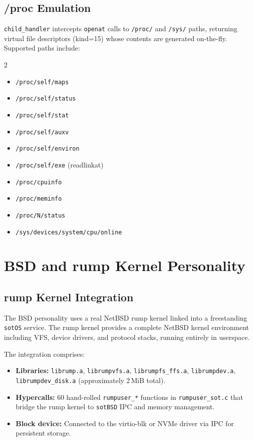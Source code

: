 \documentclass[11pt,a4paper,twoside]{report}
\theoremstyle{definition}
\newcommand{\sotOS}{\texttt{sotOS}}
\newcommand{\sotBSD}{\texttt{sotBSD}}
\begin{document}
\section{/proc Emulation}

\texttt{child\_handler} intercepts \texttt{openat} calls to \texttt{/proc/}
and \texttt{/sys/} paths, returning virtual file descriptors (kind=15) whose
contents are generated on-the-fly. Supported paths include:

\begin{multicols}{2}
\begin{itemize}[leftmargin=1em,itemsep=0pt]
  \item \texttt{/proc/self/maps}
  \item \texttt{/proc/self/status}
  \item \texttt{/proc/self/stat}
  \item \texttt{/proc/self/auxv}
  \item \texttt{/proc/self/environ}
  \item \texttt{/proc/self/exe} (readlinkat)
  \item \texttt{/proc/cpuinfo}
  \item \texttt{/proc/meminfo}
  \item \texttt{/proc/N/status}
  \item \texttt{/sys/devices/system/cpu/online}
\end{itemize}
\end{multicols}


\chapter{BSD and rump Kernel Personality}
\label{ch:bsd}

\section{rump Kernel Integration}

The BSD personality uses a real NetBSD rump kernel linked into a freestanding
\sotOS{} service. The rump kernel provides a complete NetBSD kernel
environment including VFS, device drivers, and protocol stacks, running
entirely in userspace.

The integration comprises:
\begin{itemize}[leftmargin=1.4em]
  \item \textbf{Libraries:} \texttt{librump.a}, \texttt{librumpvfs.a},
    \texttt{librumpfs\_ffs.a}, \texttt{librumpdev.a},
    \texttt{librumpdev\_disk.a} (approximately 2\,MiB total).
  \item \textbf{Hypercalls:} 60 hand-rolled \texttt{rumpuser\_*} functions
    in \texttt{rumpuser\_sot.c} that bridge the rump kernel to \sotBSD{}
    IPC and memory management.
  \item \textbf{Block device:} Connected to the virtio-blk or NVMe driver
    via IPC for persistent storage.
\end{itemize}
\end{document}
